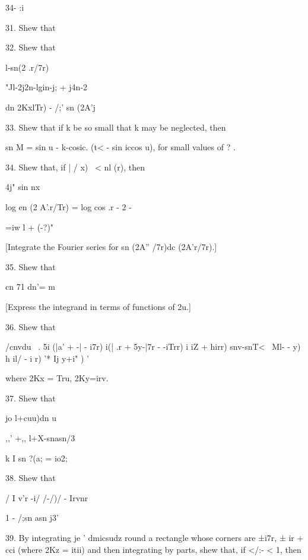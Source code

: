 
34- :i

%
%

31. Shew that


32. Shew that

l-sn(2 .r/7r)

"Jl-2j2n-lgin-j; + j4n-2

 dn 2KxlTr) - /;' sn (2A'j


33. Shew that if k be so small that k may be neglected, then

sn M = sin u - k-cosic. (t< - sin iccos u), for small values of ? .

34. Shew that, if | / x) \ < nl (r), then

4j" sin nx

log en (2 A'.r/Tr) = log cos .r - 2 -

 =iw l + (-?)"

 [Integrate the Fourier series for sn (2A'' /7r)dc
(2A'r/7r).]

35. Shew that

cn 71 dn'= m

 [Express the integrand in terms of functions of
2u.]

36. Shew that

/cnvdu \ . 5i (|a' + -| - i7r) i(| .r + 5y-|7r - -iTrr) i iZ + hirr)
snv-snT<~ Ml- - y) h il/ - i r) '* Ij y+i" ) '

where 2Kx = Tru, 2Ky=irv. 

37. Shew that

  jo l+cuu)dn u


,,' +,, l+X-snasn/3

k I sn ?(a; = io2;

38. Shew that

/ I v'r -i/ /-/)/ - Irvnr

1 - /;sn asn j3'


39. By integrating je ' dmicsudz round a rectangle whose corners are
±i7r, ± ir + cci (where 2Kz = itii) and then integrating by parts,
shew that, if </:- < 1, then

